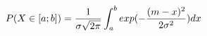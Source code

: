 \documentclass[preview]{standalone}
\begin{document}
\begin{align*}
P( X \in [a;b] )
                = { \frac{1}{\sigma \sqrt{2\pi}} } \int_a^b { exp(-{ \frac{(m - x)^2}{2 \sigma^2} }) } \space dx
\end{align*}
\end{document}

